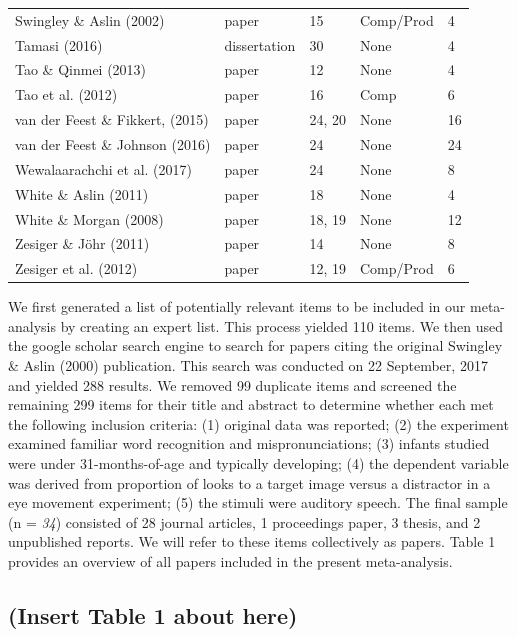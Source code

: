 \documentclass[man]{apa6}
\newenvironment{lltable}{\begin{landscape}\begin{center}\begin{ThreePartTable}}{\end{ThreePartTable}\end{center}\end{landscape}}
\theoremstyle{definition}
\theoremstyle{definition}
\theoremstyle{definition}
\theoremstyle{remark}
\begin{document}
\begin{lltable}
\begin{longtable}{lllll}
Swingley \& Aslin (2002) & paper & 15 & Comp/Prod & 4\\
Tamasi (2016) & dissertation & 30 & None & 4\\
Tao \& Qinmei (2013) & paper & 12 & None & 4\\
Tao et al. (2012) & paper & 16 & Comp & 6\\
van der Feest \& Fikkert, (2015) & paper & 24, 20 & None & 16\\
van der Feest \& Johnson (2016) & paper & 24 & None & 24\\
Wewalaarachchi et al. (2017) & paper & 24 & None & 8\\
White \& Aslin (2011) & paper & 18 & None & 4\\
White \& Morgan (2008) & paper & 18, 19 & None & 12\\
Zesiger \& Jöhr (2011) & paper & 14 & None & 8\\
Zesiger et al. (2012) & paper & 12, 19 & Comp/Prod & 6\\
\bottomrule
\end{longtable}
\end{lltable}

We first generated a list of potentially relevant items to be included
in our meta-analysis by creating an expert list. This process yielded
110 items. We then used the google scholar search engine to search for
papers citing the original Swingley \& Aslin (2000) publication. This
search was conducted on 22 September, 2017 and yielded 288 results. We
removed 99 duplicate items and screened the remaining 299 items for
their title and abstract to determine whether each met the following
inclusion criteria: (1) original data was reported; (2) the experiment
examined familiar word recognition and mispronunciations; (3) infants
studied were under 31-months-of-age and typically developing; (4) the
dependent variable was derived from proportion of looks to a target
image versus a distractor in a eye movement experiment; (5) the stimuli
were auditory speech. The final sample (n = \emph{34}) consisted of 28
journal articles, 1 proceedings paper, 3 thesis, and 2 unpublished
reports. We will refer to these items collectively as papers. Table 1
provides an overview of all papers included in the present
meta-analysis.

\subsection{(Insert Table 1 about
here)}\label{insert-table-1-about-here}
\end{document}
